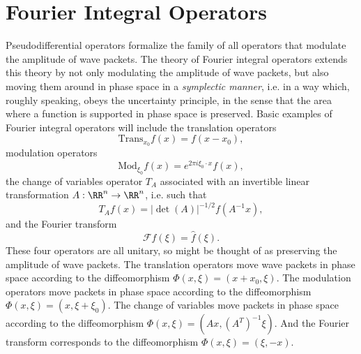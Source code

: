 \chapter{Fourier Integral Operators}

Pseudodifferential operators formalize the family of all operators that modulate the amplitude of wave packets. The theory of Fourier integral operators extends this theory by not only modulating the amplitude of wave packets, but also moving them around in phase space in a \emph{symplectic manner}, i.e. in a way which, roughly speaking, obeys the uncertainty principle, in the sense that the area where a function is supported in phase space is preserved. Basic examples of Fourier integral operators will include the translation operators
%
\[ \text{Trans}_{x_0} f(x) = f(x - x_0), \]
%
modulation operators
%
\[ \text{Mod}_{\xi_0} f(x) = e^{2 \pi i \xi_0 \cdot x} f(x), \]
%
the change of variables operator $T_A$ associated with an invertible linear transformation $A: \RR^n \to \RR^n$, i.e. such that
%
\[ T_A f(x) =  |\det(A)|^{-1/2} f(A^{-1} x), \]
%
and the Fourier transform
%
\[ \mathcal{F}f(\xi) = \widehat{f}(\xi). \]
%
These four operators are all unitary, so might be thought of as preserving the amplitude of wave packets. The translation operators move wave packets in phase space according to the diffeomorphism $\Phi(x,\xi) = (x + x_0, \xi)$. The modulation operators move packets in phase space according to the diffeomorphism $\Phi(x,\xi) = (x,\xi + \xi_0)$. The change of variables move packets in phase space according to the diffeomorphism $\Phi(x,\xi) = (Ax, (A^T)^{-1} \xi)$. And the Fourier transform corresponds to the diffeomorphism $\Phi(x,\xi) = (\xi,-x)$.

